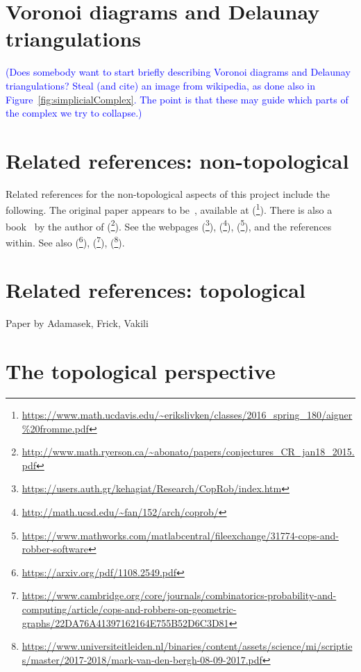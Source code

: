 \documentclass[amscd, amssymb, verbatim]{amsart}[12pt]
\newcommand{\note}[1]{\textcolor{blue}{({#1})}}
\theoremstyle{plain}
\theoremstyle{definition}
\begin{document}
\section{Voronoi diagrams and Delaunay triangulations}

\note{Does somebody want to start briefly describing Voronoi diagrams and Delaunay triangulations?
Steal (and cite) an image from wikipedia, as done also in Figure~\ref{fig:simplicialComplex}. The point is that these may guide which parts of the complex we try to collapse.}



\section{Related references: non-topological}

Related references for the non-topological aspects of this project include the following.
The original paper appears to be~\cite{aigner1984game}, available at (\footnote{\url{https://www.math.ucdavis.edu/~erikslivken/classes/2016\_spring\_180/aigner\%20fromme.pdf}}). There is also a book~\cite{bonato2011game} by the author of (\footnote{\url{http://www.math.ryerson.ca/~abonato/papers/conjectures\_CR\_jan18\_2015.pdf}}). See the webpages (\footnote{\url{https://users.auth.gr/kehagiat/Research/CopRob/index.htm}}), (\footnote{\url{http://math.ucsd.edu/~fan/152/arch/coprob/}}), (\footnote{\url{https://www.mathworks.com/matlabcentral/fileexchange/31774-cops-and-robber-software}}), and the references within. See also (\footnote{\url{https://arxiv.org/pdf/1108.2549.pdf}}), (\footnote{\url{https://www.cambridge.org/core/journals/combinatorics-probability-and-computing/article/cops-and-robbers-on-geometric-graphs/22DA76A41397162164E755B52D6C3D81}}), (\footnote{\url{https://www.universiteitleiden.nl/binaries/content/assets/science/mi/scripties/master/2017-2018/mark-van-den-bergh-08-09-2017.pdf}}).



\section{Related references: topological}

\cite{chambers2010vietoris}

Paper by Adamasek, Frick, Vakili



\section{The topological perspective}
\end{document}
